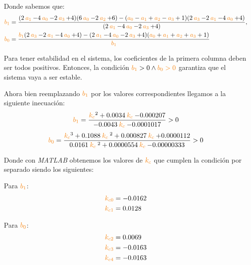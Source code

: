 Donde sabemos que:
\begin{align}
  \nara{b_1} &= \frac{( 2\nara{a_1} - 4\nara{a_0} - 2 \nara{a_3} +4 )( 6\nara{a_0} - 2\nara{a_2} +6 )- (\nara{a_0} - \nara{a_1} + \nara{a_2} -\nara{a_3} + 1)(2\nara{a_3} - 2\nara{a_1} - 4\nara{a_0} + 4 ) }{( 2\nara{a_1} - 4\nara{a_0} - 2 \nara{a_3} +4 ) },\\ 
  \nara{b_0} &= \frac{\nara{b_1} (2\nara{a_3} - 2\nara{a_1} - 4\nara{a_0} + 4 ) -( 2\nara{a_1} - 4\nara{a_0} - 2 \nara{a_3} +4 ) (\nara{a_0} + \nara{a_1} + \nara{a_2} +\nara{a_3} + 1) }{\nara{b_1}}
\end{align}

Para tener estabilidad en el sistema, los coeficientes de la primera columna
deben ser todos positivos. Entonces, la condición $\nara{b_1} > 0 \land \nara{b_0>0}$ garantiza
que el sistema vaya a ser estable.

Ahora bien reemplazando $\nara{b_1}$ por los valores correspondientes llegamos
a la siguiente inecuación: %
\begin{equation}
    \nara{b_1} = \frac{\nara{k_c}^2  +0.0034 \nara{k_c}  -0.000207}{-0.0043
    \nara{k_c}  -0.0001017} > 0
\end{equation}
\begin{equation}
    \nara{b_0} = \frac{\nara{k_c}^3  + 0.1088\nara{k_c}^2  +0.000827 \nara{k_c} +0.0000112}{0.0161\nara{k_c}^2   +0.0000554\nara{k_c} -0.00000333} > 0
\end{equation}

Donde con \textit{MATLAB} obtenemos los valores de $\nara{k_c}$ que cumplen la condición por separado siendo los siguientes:

\vspace*{0.2cm}

    \begin{multicols}{2}
        Para $\nara{b_1}$: 
        \begin{align}
            \nara{k_{c0}} & = -0.0162 \\
            \nara{k_{c1}} & = 0.0128
        \end{align}

        \columnbreak
        
        Para $\nara{b_0}$:
        \begin{align}
            \nara{k_{c2}} & = 0.0069 \\
            \nara{k_{c3}} & = -0.0163 \\
            \nara{k_{c4}} & = -0.0163
        \end{align}
    \end{multicols}

